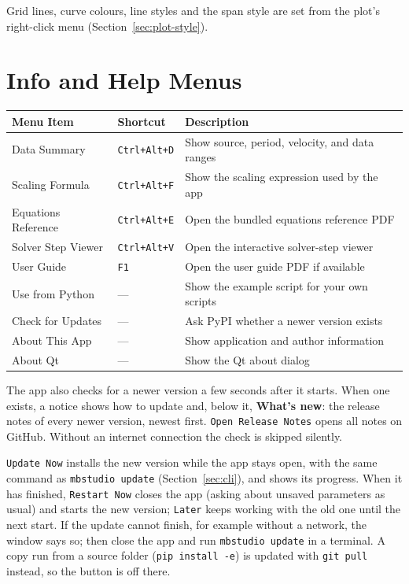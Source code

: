 \documentclass[12pt,a4paper]{article}
\newcommand{\menu}[1]{\texttt{#1}}
\newcommand{\key}[1]{\texttt{#1}}
\begin{document}
Grid lines, curve colours, line styles and the span style are set from the plot's right-click menu
(Section~\ref{sec:plot-style}).

\section{Info and Help Menus}

\begin{center}
\begin{tabular}{@{}lll@{}}
  \toprule
  Menu Item & Shortcut & Description \\
  \midrule
  Data Summary        & \key{Ctrl+Alt+D} & Show source, period, velocity, and data ranges \\
  Scaling Formula     & \key{Ctrl+Alt+F} & Show the scaling expression used by the app \\
  Equations Reference & \key{Ctrl+Alt+E} & Open the bundled equations reference PDF \\
  Solver Step Viewer  & \key{Ctrl+Alt+V} & Open the interactive solver-step viewer \\
  User Guide          & \key{F1}         & Open the user guide PDF if available \\
  Use from Python     & ---              & Show the example script for your own scripts \\
  Check for Updates   & ---              & Ask PyPI whether a newer version exists \\
  About This App      & ---              & Show application and author information \\
  About Qt            & ---              & Show the Qt about dialog \\
  \bottomrule
\end{tabular}
\end{center}

The app also checks for a newer version a few seconds after it starts. When one exists, a notice
shows how to update and, below it, \textbf{What's new}: the release notes of every newer version,
newest first. \menu{Open Release Notes} opens all notes on GitHub. Without an internet connection
the check is skipped silently.

\menu{Update Now} installs the new version while the app stays open, with the same command as
\texttt{mbstudio update} (Section~\ref{sec:cli}), and shows its progress. When it has finished,
\menu{Restart Now} closes the app (asking about unsaved parameters as usual) and starts the new
version; \menu{Later} keeps working with the old one until the next start. If the update cannot
finish, for example without a network, the window says so; then close the app and run
\texttt{mbstudio update} in a terminal. A copy run from a source folder (\texttt{pip install -e})
is updated with \texttt{git pull} instead, so the button is off there.
\end{document}
